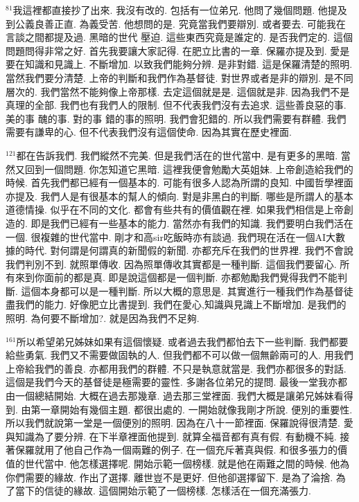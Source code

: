 \documentclass{book}
\begin{document}
$^{81}$我這裡都直接抄了出來.
我沒有改的.
包括有一位弟兄.
他問了幾個問題.
他提及到公義良善正直.
為義受苦.
他想問的是.
究竟當我們要辯別.
或者要去.
可能我在言談之間都提及過.
黑暗的世代 壓迫.
這些東西究竟是誰定的.
是否我們定的.
這個問題問得非常之好.
首先我要讓大家記得.
在肥立比書的一章.
保羅亦提及到.
愛是要在知識和見識上.
不斷增加.
以致我們能夠分辨.
是非對錯.
這是保羅清楚的照明.
當然我們要分清楚.
上帝的判斷和我們作為基督徒.
對世界或者是非的辯別.
是不同層次的.
我們當然不能夠像上帝那樣.
去定這個就是是.
這個就是非.
因為我們不是真理的全部.
我們也有我們人的限制.
但不代表我們沒有去追求.
這些善良惡的事.
美的事 醜的事.
對的事 錯的事的照明.
我們會犯錯的.
所以我們需要有群體.
我們需要有謙卑的心.
但不代表我們沒有這個使命.
因為其實在歷史裡面.

$^{121}$都在告訴我們.
我們縱然不完美.
但是我們活在的世代當中.
是有更多的黑暗.
當然又回到一個問題.
你怎知道它黑暗.
這裡我便會勉勵大英姐妹.
上帝創造給我們的時候.
首先我們都已經有一個基本的.
可能有很多人認為所謂的良知.
中國哲學裡面亦提及.
我們人是有很基本的幫人的傾向.
對是非黑白的判斷.
哪些是所謂人的基本道德情操.
似乎在不同的文化.
都會有些共有的價值觀在裡.
如果我們相信是上帝創造的.
即是我們已經有一些基本的能力.
當然亦有我們的知識.
我們要明白我們活在一個.
很複雜的世代當中.
剛才和高sir吃飯時亦有談過.
我們現在活在一個AI大數據的時代.
對何謂是何謂真的新聞假的新聞.
亦都充斥在我們的世界裡.
我們不會說我們判別不到.
就照單傳收.
因為照單傳收其實都是一種判斷.
這個我們要留心.
所有來到你面前的都是真.
即是說這個都是一個判斷.
亦都勉勵我們覺得我們不能判斷.
這個本身都可以是一種判斷.
所以大概的意思是.
其實進行一種我們作為基督徒盡我們的能力.
好像肥立比書提到.
我們在愛心,知識與見識上不斷增加.
是我們的照明.
為何要不斷增加?.
就是因為我們不足夠.

$^{161}$所以希望弟兄姊妹如果有這個懷疑.
或者過去我們都怕去下一些判斷.
我們都要給些勇氣.
我們又不需要做固執的人.
但我們都不可以做一個無齡兩可的人.
用我們上帝給我們的善良.
亦都用我們的群體.
不只是執意就當是.
我們亦都很多的對話.
這個是我們今天的基督徒是極需要的靈性.
多謝各位弟兄的提問.
最後一堂我亦都由一個總結開始.
大概在過去那幾章.
過去那三堂裡面.
我們大概是讓弟兄姊妹看得到.
由第一章開始有幾個主題.
都很出處的.
一開始就像我剛才所說.
便別的重要性.
所以我們就說第一堂是一個便別的照明.
因為在八十一節裡面.
保羅說得很清楚.
愛與知識為了要分辨.
在下半章裡面他提到.
就算全福音都有真有假.
有動機不純.
接著保羅就用了他自己作為一個兩難的例子.
在一個充斥著真與假.
和很多張力的價值的世代當中.
他怎樣選擇呢.
開始示範一個榜樣.
就是他在兩難之間的時候.
他為你們需要的緣故.
作出了選擇.
離世豈不是更好.
但他卻選擇留下.
是為了淪捨.
為了當下的信徒的緣故.
這個開始示範了一個榜樣.
怎樣活在一個充滿張力.
\end{document}
